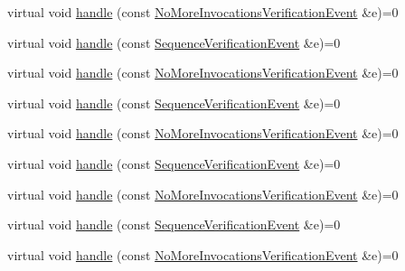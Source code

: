 \begin{DoxyCompactItemize}
\item 
virtual void \mbox{\hyperlink{structfakeit_1_1VerificationEventHandler_a826b9d15e23bad7013b219d8e45ef1d0}{handle}} (const \mbox{\hyperlink{structfakeit_1_1NoMoreInvocationsVerificationEvent}{No\+More\+Invocations\+Verification\+Event}} \&e)=0
\item 
virtual void \mbox{\hyperlink{structfakeit_1_1VerificationEventHandler_adf355a9888bc2bf78ce0e1219bfb1379}{handle}} (const \mbox{\hyperlink{structfakeit_1_1SequenceVerificationEvent}{Sequence\+Verification\+Event}} \&e)=0
\item 
virtual void \mbox{\hyperlink{structfakeit_1_1VerificationEventHandler_a826b9d15e23bad7013b219d8e45ef1d0}{handle}} (const \mbox{\hyperlink{structfakeit_1_1NoMoreInvocationsVerificationEvent}{No\+More\+Invocations\+Verification\+Event}} \&e)=0
\item 
virtual void \mbox{\hyperlink{structfakeit_1_1VerificationEventHandler_adf355a9888bc2bf78ce0e1219bfb1379}{handle}} (const \mbox{\hyperlink{structfakeit_1_1SequenceVerificationEvent}{Sequence\+Verification\+Event}} \&e)=0
\item 
virtual void \mbox{\hyperlink{structfakeit_1_1VerificationEventHandler_a826b9d15e23bad7013b219d8e45ef1d0}{handle}} (const \mbox{\hyperlink{structfakeit_1_1NoMoreInvocationsVerificationEvent}{No\+More\+Invocations\+Verification\+Event}} \&e)=0
\item 
virtual void \mbox{\hyperlink{structfakeit_1_1VerificationEventHandler_adf355a9888bc2bf78ce0e1219bfb1379}{handle}} (const \mbox{\hyperlink{structfakeit_1_1SequenceVerificationEvent}{Sequence\+Verification\+Event}} \&e)=0
\item 
virtual void \mbox{\hyperlink{structfakeit_1_1VerificationEventHandler_a826b9d15e23bad7013b219d8e45ef1d0}{handle}} (const \mbox{\hyperlink{structfakeit_1_1NoMoreInvocationsVerificationEvent}{No\+More\+Invocations\+Verification\+Event}} \&e)=0
\item 
virtual void \mbox{\hyperlink{structfakeit_1_1VerificationEventHandler_adf355a9888bc2bf78ce0e1219bfb1379}{handle}} (const \mbox{\hyperlink{structfakeit_1_1SequenceVerificationEvent}{Sequence\+Verification\+Event}} \&e)=0
\item 
virtual void \mbox{\hyperlink{structfakeit_1_1VerificationEventHandler_a826b9d15e23bad7013b219d8e45ef1d0}{handle}} (const \mbox{\hyperlink{structfakeit_1_1NoMoreInvocationsVerificationEvent}{No\+More\+Invocations\+Verification\+Event}} \&e)=0
\end{DoxyCompactItemize}


